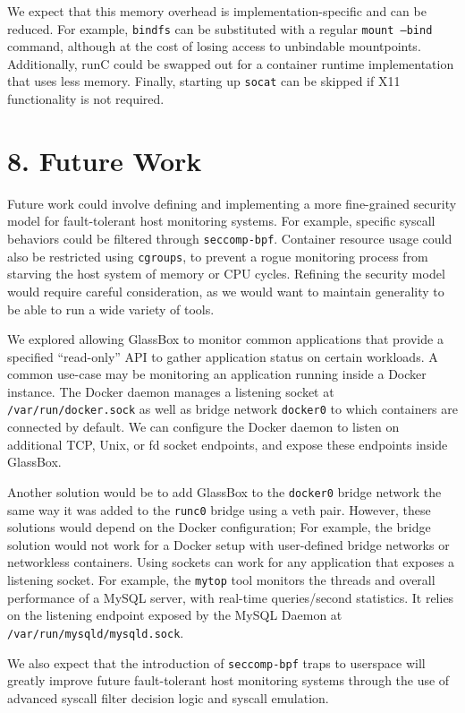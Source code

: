 \documentclass{proc}
\begin{document}
We expect that this memory overhead is implementation-specific and can be reduced. For example, \texttt{bindfs} can be substituted with a regular \texttt{mount --bind} command, although at the cost of losing access to unbindable mountpoints. Additionally, runC could be swapped out for a container runtime implementation that uses less memory. Finally, starting up \texttt{socat} can be skipped if X11 functionality is not required.

\section*{8. Future Work}
Future work could involve defining and implementing a more fine-grained security model for fault-tolerant host monitoring systems. For example, specific syscall behaviors could be filtered through \texttt{seccomp-bpf}. Container resource usage could also be restricted using \texttt{cgroups}, to prevent a rogue monitoring process from starving the host system of memory or CPU cycles. Refining the security model would require careful consideration, as we would want to maintain generality to be able to run a wide variety of tools.

We explored allowing GlassBox to monitor common applications that provide a specified ``read-only'' API to gather application status on certain workloads. A common use-case may be monitoring an application running inside a Docker instance. The Docker daemon manages a listening socket at \texttt{/var/run/docker.sock} as well as bridge network \texttt{docker0} to which containers are connected by default. We can configure the Docker daemon to listen on additional TCP, Unix, or fd socket endpoints, and expose these endpoints inside GlassBox.

Another solution would be to add GlassBox to the \texttt{docker0} bridge network the same way it was added to the \texttt{runc0} bridge using a veth pair. However, these solutions would depend on the Docker configuration; For example, the bridge solution would not work for a Docker setup with user-defined bridge networks or networkless containers. Using sockets can work for any application that exposes a listening socket. For example, the \texttt{mytop} tool monitors the threads and overall performance of a MySQL server, with real-time queries/second statistics. It relies on the listening endpoint exposed by the MySQL Daemon at \texttt{/var/run/mysqld/mysqld.sock}.

We also expect that the introduction of \texttt{seccomp-bpf} traps to userspace \cite{seccompuserspace} will greatly improve future fault-tolerant host monitoring systems through the use of advanced syscall filter decision logic and syscall emulation.
\end{document}
